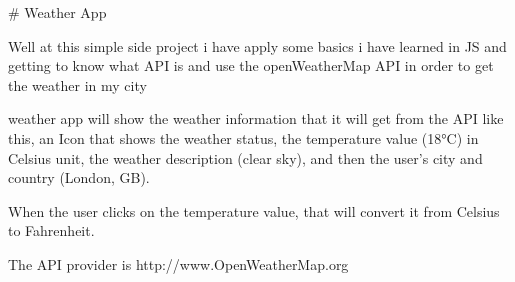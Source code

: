 # Weather App 


Well at this simple side project i have apply some basics i have learned in JS and 
getting to know what API is and use the openWeatherMap API in order to get the weather in my city 

weather app will show the weather information that it will get from the API like this,
an Icon that shows the weather status, the temperature value (18°C) in Celsius unit,
the weather description (clear sky), and then the user's city and country (London, GB).


When the user clicks on the temperature value, that will convert it from Celsius to Fahrenheit.




The API provider is http://www.OpenWeatherMap.org


